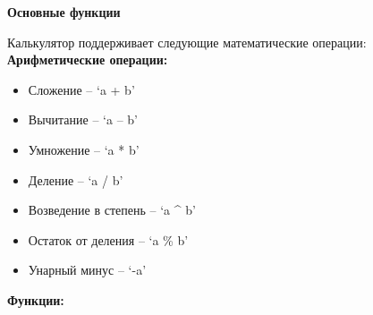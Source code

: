 \documentclass[]{article}
\begin{document}
\pagebreak[10]
\huge
\textbf{Основные функции}
\newline

\LARGE
Калькулятор поддерживает следующие математические операции:
\newline
\textbf{Арифметические операции:}


\begin{itemize}
\item
  
  Сложение -- `a + b'
  
\item
  
  Вычитание -- `a -- b'
  
\item

  Умножение -- `a * b'

\item

  Деление -- `a / b'

\item

  Возведение в степень -- `a \^{} b'

\item

  Остаток от деления -- `a \% b'

\item

  Унарный минус -- `-a'

\end{itemize}


\textbf{Функции:}
\end{document}
